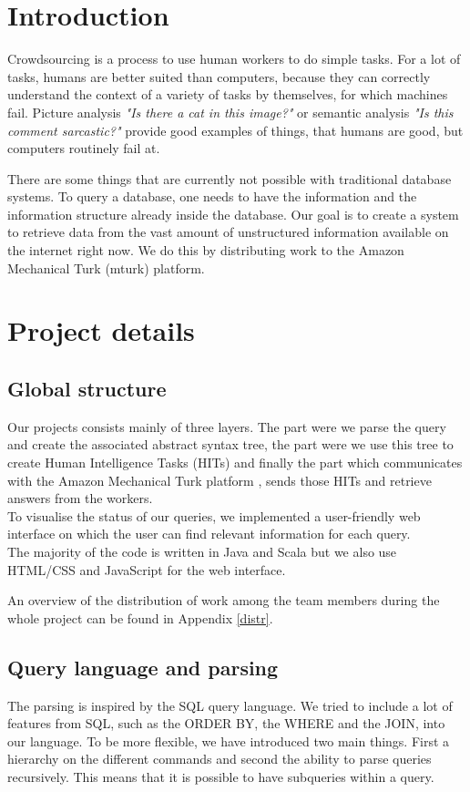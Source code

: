 \documentclass{article}
\begin{document}


\tableofcontents
\newpage


\section{Introduction}

Crowdsourcing is a process to use human workers to do simple tasks. For a lot of tasks, humans are better suited than computers, because they can correctly understand the context of a variety of tasks by themselves, for which machines fail. Picture analysis \textit{"Is there a cat in this image?"} or semantic analysis \textit{"Is this comment sarcastic?"} provide good examples of things, that humans are good, but computers routinely fail at.

There are some things that are currently not possible with traditional database systems. To query a database, one needs to have the information and the information structure already inside the database. Our goal is to create a system to retrieve data from the vast amount of unstructured information available on the internet right now. We do this by distributing work to the Amazon Mechanical Turk (mturk) platform.

\section{Project details}
\subsection{Global structure}
Our projects consists mainly of three layers. The part were we parse the query and create the associated abstract syntax tree, the part were we use this tree to create Human Intelligence Tasks (HITs) and finally the part which communicates with the Amazon Mechanical Turk platform , sends those HITs and retrieve answers from the workers.\\
To visualise the status of our queries, we implemented a user-friendly web interface on which the user can find relevant information for each query.\\ The majority of the code is written in Java and Scala but we also use HTML/CSS and JavaScript for the web interface.

An overview of the distribution of work among the team members during the whole project can be found in Appendix \ref{distr}.
\subsection{Query language and parsing}
The parsing is inspired by the SQL query language. We tried to include a lot of features from SQL, such as the ORDER BY, the WHERE and the JOIN, into our language. To be more flexible, we have introduced two main things. First a hierarchy on the different commands and second the ability to parse queries recursively. This means that it is possible to have subqueries within a query.
\end{document}
